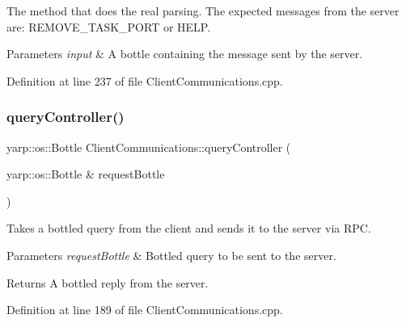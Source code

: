 The method that does the real parsing. The expected messages from the server are\+: R\+E\+M\+O\+V\+E\+\_\+\+T\+A\+S\+K\+\_\+\+P\+O\+RT or H\+E\+LP.


\begin{DoxyParams}{Parameters}
{\em input} & A bottle containing the message sent by the server. \\
\hline
\end{DoxyParams}


Definition at line 237 of file Client\+Communications.\+cpp.

\hypertarget{classocra__recipes_1_1ClientCommunications_a555bf79c855b3c08402a5ba4d6f9410c}{}\label{classocra__recipes_1_1ClientCommunications_a555bf79c855b3c08402a5ba4d6f9410c} 
\subsubsection{\texorpdfstring{query\+Controller()}{queryController()}\hspace{0.1cm}{\footnotesize\ttfamily [1/3]}}
{\footnotesize\ttfamily yarp\+::os\+::\+Bottle Client\+Communications\+::query\+Controller (\begin{DoxyParamCaption}\item[{yarp\+::os\+::\+Bottle \&}]{request\+Bottle }\end{DoxyParamCaption})}

Takes a bottled query from the client and sends it to the server via R\+PC.


\begin{DoxyParams}{Parameters}
{\em request\+Bottle} & Bottled query to be sent to the server.\\
\hline
\end{DoxyParams}
\begin{DoxyReturn}{Returns}
A bottled reply from the server. 
\end{DoxyReturn}


Definition at line 189 of file Client\+Communications.\+cpp.

\hypertarget{classocra__recipes_1_1ClientCommunications_acd90f49ce7b275b83a73a75b9b355109}{}\label{classocra__recipes_1_1ClientCommunications_acd90f49ce7b275b83a73a75b9b355109} 
